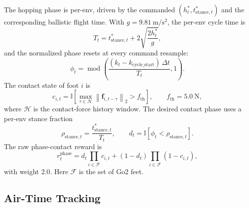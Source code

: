 \documentclass[11pt, a4paper]{article}
\begin{document}
The hopping phase is per-env, driven by the commanded
$(h^{*}_t, t^{*}_{\mathrm{stance},t})$ and the corresponding ballistic flight
time. With $g = 9.81\ \mathrm{m/s^2}$, the per-env cycle time is
\begin{equation}
    T_t = t^{*}_{\mathrm{stance},t} + 2\sqrt{\frac{2 h^{*}_t}{g}},
\end{equation}
and the normalized phase resets at every command resample:
\begin{equation}
    \phi_t =
    \operatorname{mod}
    \left(
        \frac{(k_t - k_{\mathrm{cycle\_start}})\,\Delta t}{T_t},
        1
    \right).
\end{equation}
The contact state of foot $i$ is
\begin{equation}
    c_{i,t} =
    \mathbb{I}
    \left[
        \max_{\tau \in \mathcal{H}}
        \left\lVert \bm{f}_{i,t-\tau} \right\rVert_2
        > f_{\mathrm{th}}
    \right],
    \qquad
    f_{\mathrm{th}} = 5.0\ \mathrm{N},
\end{equation}
where $\mathcal{H}$ is the contact-force history window. The desired contact
phase uses a per-env stance fraction
\begin{equation}
    \rho_{\mathrm{stance},t} = \frac{t^{*}_{\mathrm{stance},t}}{T_t},
    \qquad
    d_t =
    \mathbb{I}
    \left[
        \phi_t < \rho_{\mathrm{stance},t}
    \right].
\end{equation}
The raw phase-contact reward is
\begin{equation}
    r^{\mathrm{phase}}_t =
    d_t \prod_{i \in \mathcal{F}} c_{i,t}
    + (1 - d_t) \prod_{i \in \mathcal{F}} (1 - c_{i,t}),
\end{equation}
with weight $2.0$. Here $\mathcal{F}$ is the set of Go2 feet.

\subsection{Air-Time Tracking}
\end{document}
